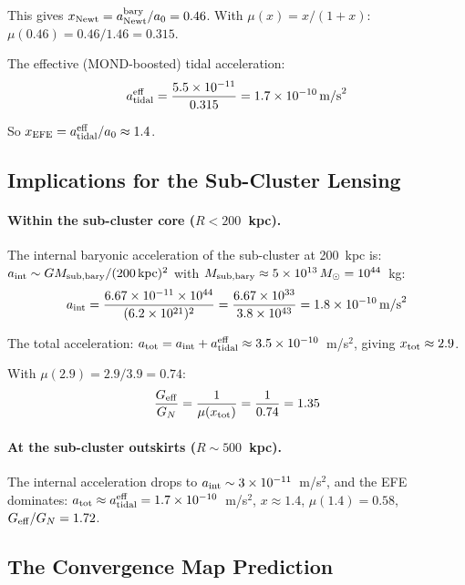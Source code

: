 \documentclass[11pt,a4paper]{article}
\newcommand{\Geff}{G_{\rm eff}}
\newcommand{\ee}[1]{\times 10^{#1}}
\begin{document}
This gives $x_{\rm Newt} = a_{\rm Newt}^{\rm bary}/a_0 = 0.46$.
With $\mu(x) = x/(1+x)$: $\mu(0.46) = 0.46/1.46 = 0.315$.

The effective (MOND-boosted) tidal acceleration:
\begin{equation}
a_{\rm tidal}^{\rm eff} = \frac{5.5\ee{-11}}{0.315} = 1.7\ee{-10}\,\text{m/s}^2
\end{equation}

So $x_{\rm EFE} = a_{\rm tidal}^{\rm eff}/a_0 \approx 1.4$.

\subsection{Implications for the Sub-Cluster Lensing}

\paragraph{Within the sub-cluster core ($R < 200$~kpc).}
The internal baryonic acceleration of the sub-cluster at 200~kpc is:
$a_{\rm int} \sim GM_{\rm sub,bary}/(200\,\text{kpc})^2$ with
$M_{\rm sub,bary} \approx 5\ee{13}\,M_\odot = 10^{44}$~kg:
\begin{equation}
a_{\rm int} = \frac{6.67\ee{-11} \times 10^{44}}{(6.2\ee{21})^2}
= \frac{6.67\ee{33}}{3.8\ee{43}} = 1.8\ee{-10}\,\text{m/s}^2
\end{equation}

The total acceleration: $a_{\rm tot} = a_{\rm int} + a_{\rm tidal}^{\rm eff}
\approx 3.5\ee{-10}$~m/s$^2$, giving $x_{\rm tot} \approx 2.9$.

With $\mu(2.9) = 2.9/3.9 = 0.74$:
\begin{equation}
\frac{\Geff}{G_N} = \frac{1}{\mu(x_{\rm tot})} = \frac{1}{0.74} = 1.35
\end{equation}

\paragraph{At the sub-cluster outskirts ($R \sim 500$~kpc).}
The internal acceleration drops to $a_{\rm int} \sim 3\ee{-11}$~m/s$^2$,
and the EFE dominates: $a_{\rm tot} \approx a_{\rm tidal}^{\rm eff} =
1.7\ee{-10}$~m/s$^2$, $x \approx 1.4$, $\mu(1.4) = 0.58$,
$\Geff/G_N = 1.72$.

\subsection{The Convergence Map Prediction}
\end{document}
